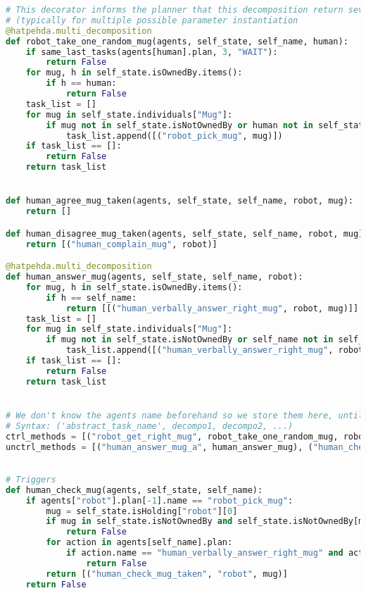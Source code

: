 \begin{lstlisting}[language=Python]
# This decorator informs the planner that this decomposition return several disjunctive sequences of tasks
# (typically for multiple possible parameter instantiation
@hatpehda.multi_decomposition
def robot_take_one_random_mug(agents, self_state, self_name, human):
    if same_last_tasks(agents[human].plan, 3, "WAIT"):
        return False
    for mug, h in self_state.isOwnedBy.items():
        if h == human:
            return False
    task_list = []
    for mug in self_state.individuals["Mug"]:
        if mug not in self_state.isNotOwnedBy or human not in self_state.isNotOwnedBy[mug]:
            task_list.append([("robot_pick_mug", mug)])
    if task_list == []:
        return False
    return task_list


def human_agree_mug_taken(agents, self_state, self_name, robot, mug):
    return []

def human_disagree_mug_taken(agents, self_state, self_name, robot, mug):
    return [("human_complain_mug", robot)]

@hatpehda.multi_decomposition
def human_answer_mug(agents, self_state, self_name, robot):
    for mug, h in self_state.isOwnedBy.items():
        if h == self_name:
            return [[("human_verbally_answer_right_mug", robot, mug)]]
    task_list = []
    for mug in self_state.individuals["Mug"]:
        if mug not in self_state.isNotOwnedBy or self_name not in self_state.isNotOwnedBy[mug]:
            task_list.append([("human_verbally_answer_right_mug", robot, mug)])
    if task_list == []:
        return False
    return task_list


# We don't know the agents name beforehand so we store them here, until we can add the proper agents
# Syntax: ('abstract_task_name', decompo1, decompo2, ...)
ctrl_methods = [("robot_get_right_mug", robot_take_one_random_mug, robot_ask_take_mug)]
unctrl_methods = [("human_answer_mug_a", human_answer_mug), ("human_check_mug_taken", human_agree_mug_taken, human_disagree_mug_taken)]
    

# Triggers
def human_check_mug(agents, self_state, self_name):
    if agents["robot"].plan[-1].name == "robot_pick_mug":
        mug = self_state.isHolding["robot"][0]
        if mug in self_state.isNotOwnedBy and self_state.isNotOwnedBy[mug] == self_name:
            return False
        for action in agents[self_name].plan:
            if action.name == "human_verbally_answer_right_mug" and action.parameters[1] == mug:
                return False
        return [("human_check_mug_taken", "robot", mug)]
    return False


\end{lstlisting}
